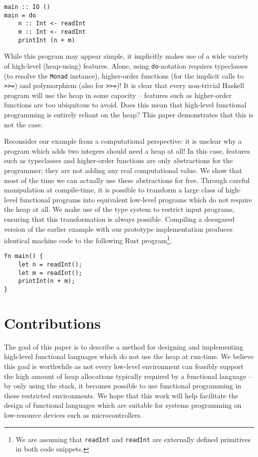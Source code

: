\documentclass[runningheads]{llncs}
\begin{document}
\begin{verbatim}
main :: IO ()
main = do
    n :: Int <- readInt
    m :: Int <- readInt
    printInt (n + m)
\end{verbatim}

While this program may appear simple, it implicitly makes use of a wide variety of high-level (heap-using) features. Alone, using \texttt{do}-notation requires typeclasses (to resolve the \texttt{Monad} instance), higher-order functions (for the implicit calls to \texttt{>>=}) and polymorphism (also for \texttt{>>=})! It is clear that every non-trivial Haskell program will use the heap in some capacity -- features such as higher-order functions are too ubiquitous to avoid. Does this mean that high-level functional programming is entirely reliant on the heap? This paper demonstrates that this is not the case.

Reconsider our example from a computational perspective: it is unclear why a program which adds two integers should need a heap at all! In this case, features such as typeclasses and higher-order functions are only abstractions for the programmer; they are not adding any real computational value. We show that most of the time we can actually use these abstractions for free. Through careful manipulation at compile-time, it is possible to transform a large class of high-level functional programs into equivalent low-level programs which do not require the heap at all. We make use of the type system to restrict input programs, ensuring that this transformation is always possible. Compiling a desugared version of the earlier example with our prototype implementation produces identical machine code to the following Rust program\footnote{We are assuming that \texttt{readInt} and \texttt{readInt} are externally defined primitives in both code snippets.}.

\begin{verbatim}
fn main() {
    let n = readInt();
    let m = readInt();
    printInt(n + m);
}
\end{verbatim}

\section{Contributions}

The goal of this paper is to describe a method for designing and implementing high-level functional languages which do not use the heap at run-time. We believe this goal is worthwhile as not every low-level environment can feasibly support the high amount of heap allocations typically required by a functional language -- by only using the stack, it becomes possible to use functional programming in these restricted environments. We hope that this work will help facilitate the design of functional languages which are suitable for systems programming on low-resource devices such as microcontrollers.
\end{document}
